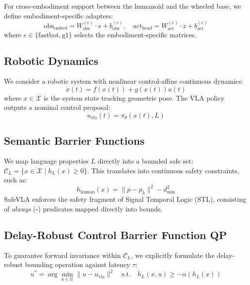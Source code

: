 \documentclass[conference]{IEEEtran}
\begin{document}
For cross-embodiment support between the humanoid and the wheeled base, we define embodiment-specific adapters:
\begin{equation}
\text{obs}_\text{embed} = W_{\text{obs}}^{(e)} \cdot s + b_{\text{obs}}^{(e)}, \quad
\text{act}_\text{head} = W_{\text{act}}^{(e)} \cdot z + b_{\text{act}}^{(e)}
\end{equation}
where $e \in \{\text{fastbot}, \text{g1}\}$ selects the embodiment-specific matrices.

\subsection{Robotic Dynamics}
We consider a robotic system with nonlinear control-affine continuous dynamics:
\begin{equation}
\dot{x}(t) = f(x(t)) + g(x(t))u(t)
\end{equation}
where $x \in \mathcal{X}$ is the system state tracking geometric pose. The VLA policy outputs a nominal control proposal:
\begin{equation}
u_{\text{vla}}(t) = \pi_\theta(x(t), L)
\end{equation}

\subsection{Semantic Barrier Functions}
We map language properties $L$ directly into a bounded safe set: $\mathcal{C}_L = \{ x \in \mathcal{X} \mid h_L(x) \geq 0 \}$. This translates into continuous safety constraints, such as:
\begin{equation}
h_{\text{human}}(x) = \|p - p_h\|^2 - d_{\min}^2
\end{equation}
SafeVLA enforces the safety fragment of Signal Temporal Logic (STL), consisting of \textit{always} ($\square$) predicates mapped directly into bounds.

\subsection{Delay-Robust Control Barrier Function QP}
To guarantee forward invariance within $\mathcal{C}_L$, we explicitly formulate the delay-robust bounding operation against latency $\tau$:
\begin{equation}
u^* = \arg\min_{u \in \mathcal{U}} \|u - u_{\text{vla}}\|^2 \quad \text{s.t.} \quad \dot{h}_L(x, u) \geq -\alpha(h_L(x))
\end{equation}
\end{document}
